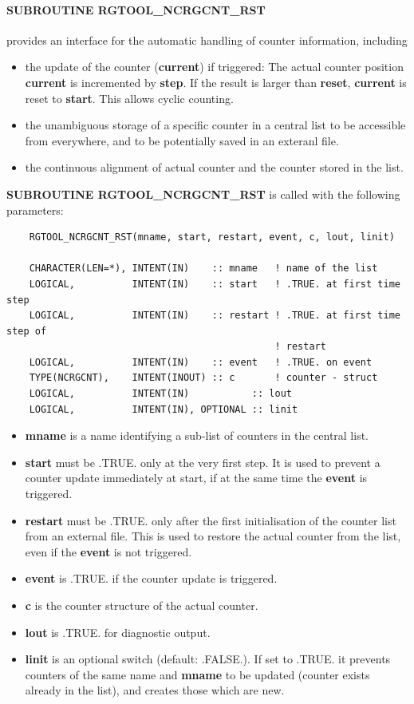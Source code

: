 \documentclass[12pt, a4paper]{article}
\begin{document}
\paragraph{\bf SUBROUTINE RGTOOL\_NCRGCNT\_RST}
%
provides an interface for the automatic handling of counter information,
including
\begin{itemize}
%
 \item the update of the counter ({\bf current}) if triggered:
       The actual counter position {\bf current} is incremented
       by {\bf step}. If the result is larger than {\bf reset},
       {\bf current} is reset to {\bf start}.
       This allows cyclic counting.
%
 \item the unambiguous storage of a specific counter in a central list
       to be accessible from everywhere, and to be potentially saved in an
       exteranl file.
%
 \item the continuous alignment of actual counter and the counter stored
       in the list.
%
\end{itemize}
%
%
{\bf SUBROUTINE RGTOOL\_NCRGCNT\_RST} is called with the following
parameters:
%
\begin{verbatim}
    RGTOOL_NCRGCNT_RST(mname, start, restart, event, c, lout, linit)

    CHARACTER(LEN=*), INTENT(IN)    :: mname   ! name of the list
    LOGICAL,          INTENT(IN)    :: start   ! .TRUE. at first time step
    LOGICAL,          INTENT(IN)    :: restart ! .TRUE. at first time step of
                                               ! restart
    LOGICAL,          INTENT(IN)    :: event   ! .TRUE. on event
    TYPE(NCRGCNT),    INTENT(INOUT) :: c       ! counter - struct
    LOGICAL,          INTENT(IN)           :: lout
    LOGICAL,          INTENT(IN), OPTIONAL :: linit

\end{verbatim}
%
\begin{itemize}
\item {\bf mname} is a name identifying a sub-list of counters in the central
                  list.
\item {\bf start} must be .TRUE. only at the very first step.
                  It is used to prevent a counter update immediately at start,
                  if at the same time the {\bf event} is triggered.   
\item {\bf restart} must be .TRUE. only after the first initialisation of the
                    counter list from an external file. This is used to
                    restore the actual counter from the list, even if
                    the {\bf event} is not triggered.
\item {\bf event} is .TRUE. if the counter update is triggered.
\item {\bf c} is the counter structure of the actual counter.
\item {\bf lout} is .TRUE. for diagnostic output.
\item {\bf linit} is an optional switch (default: .FALSE.). If set to .TRUE.
                  it prevents counters of the same name and {\bf mname} to
                  be updated (counter exists already in the list), and
                  creates those which are new.
\end{itemize}
\end{document}
